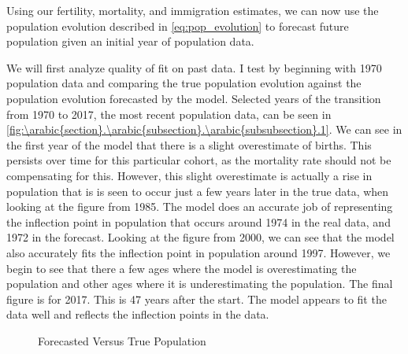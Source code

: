 \documentclass[10pt]{article}
\renewcommand{\thesection}{\arabic{section}}
\renewcommand{\thesubsection}{\thesection.\arabic{subsection}}
\renewcommand{\thesubsubsection}{\thesubsection.\arabic{subsubsection}}
\renewcommand{\subsubsection}[2][]{\oldsubsubsection[#1]{#2}\index{#1}\label{sec:\thesubsubsection}}
\numberwithin{equation}{subsection}
\newcommand*{\FigureDir}{../../graphs}
\begin{document}

\subsubsection{Population}

\par Using our fertility, mortality, and immigration estimates, we can now use the population evolution described in \ref{eq:pop_evolution} to forecast future population given an initial year of population data.

\par We will first analyze quality of fit on past data. I test by beginning with 1970 population data and comparing the true population evolution against the population evolution forecasted by the model. Selected years of the transition from 1970 to 2017, the most recent population data, can be seen in \autoref{fig:\thesubsubsection.1}. We can see in the first year of the model that there is a slight overestimate of births. This persists over time for this particular cohort, as the mortality rate should not be compensating for this. However, this slight overestimate is actually a rise in population that is is seen to occur just a few years later in the true data, when looking at the figure from 1985. The model does an accurate job of representing the inflection point in population that occurs around 1974 in the real data, and 1972 in the forecast. Looking at the figure from 2000, we can see that the model also accurately fits the inflection point in population around 1997. However, we begin to see that there a few ages where the model is overestimating the population and other ages where it is underestimating the population. The final figure is for 2017. This is 47 years after the start. The model appears to fit the data well and reflects the inflection points in the data. 

\begin{figure}[!ht]
   \centering
   \caption{\label{fig:\thesubsubsection.1}Forecasted Versus True Population}
\end{figure}
\end{document}

